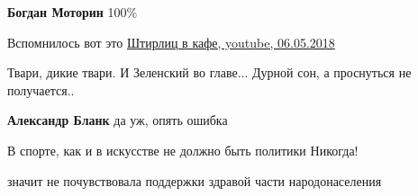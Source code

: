 \begin{itemize}
\begin{itemize}
\textbf{Богдан Моторин} 100\%
\end{itemize}

 
Вспомнилось вот это 
\href{https://youtu.be/BX_fgojCOhE}{%
Штирлиц в кафе, youtube, 06.05.2018%
}

 
Твари, дикие твари. И Зеленский во главе... Дурной сон, а проснуться не получается..

\begin{itemize}
 
\textbf{Александр Бланк} да уж, опять ошибка
\end{itemize}

 
В спорте, как и в искусстве не должно быть политики
Никогда!

 
значит не почувствовала поддержки здравой части народонаселения

 


\end{itemize}
